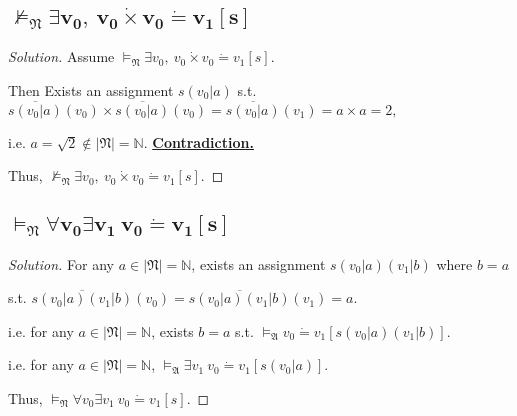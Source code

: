 \documentclass{article}
\newenvironment{solution}{\begin{proof}[\noindent\it Solution]}{\end{proof}}
\begin{document}
\vspace{1em}
\subsection{$\boldsymbol{\nvDash_{\mathfrak{N}} \exists v_0,\ v_0\dot{\times}v_0\dot{=}v_1[s]}$}
\begin{solution}
    Assume $\vDash_{\mathfrak{N}} \exists v_0,\ v_0\dot{\times}v_0\dot{=}v_1[s]$.

    \hspace{2.6em}
    Then Exists an assignment $s(v_0|a)$ s.t. $\overline{s(v_0|a)}(v_0)\times\overline{s(v_0|a)}(v_0)=\overline{s(v_0|a)}(v_1)=a\times a=2,$

    \hspace{2.6em}
    i.e. $a=\sqrt{2}\notin|\mathfrak{N}|=\mathbb{N}$. \underline{\textbf{Contradiction.}}

    \hspace{2.6em}
    Thus, $\nvDash_{\mathfrak{N}} \exists v_0,\ v_0\dot{\times}v_0\dot{=}v_1[s].$
\end{solution}

\vspace{1em}
\subsection{$\boldsymbol{\vDash_{\mathfrak{N}} \forall v_0\exists v_1\ v_0\dot{=}v_1[s]}$}
\vspace{0.5em}
\begin{solution}
    For any $a\in|\mathfrak{N}|=\mathbb{N}$, exists an assignment $s(v_0|a)(v_1|b)$ where $b=a$

    \hspace{15em}
    s.t. $\overline{s(v_0|a)(v_1|b)}(v_0)=\overline{s(v_0|a)(v_1|b)}(v_1)=a.$

    \hspace{6em}
    i.e. for any $a\in|\mathfrak{N}|=\mathbb{N}$, exists $b=a$ s.t. $\vDash_\mathfrak{A}v_0\dot{=}v_1[s(v_0|a)(v_1|b)].$

    \hspace{6em}
    i.e. for any $a\in|\mathfrak{N}|=\mathbb{N}$, $\vDash_\mathfrak{A}\exists v_1\ v_0\dot{=}v_1[s(v_0|a)].$

    \hspace{2.6em}
    Thus, $\vDash_{\mathfrak{N}} \forall v_0\exists v_1\ v_0\dot{=}v_1[s].$
\end{solution}

\vspace{1em}
\end{document}
